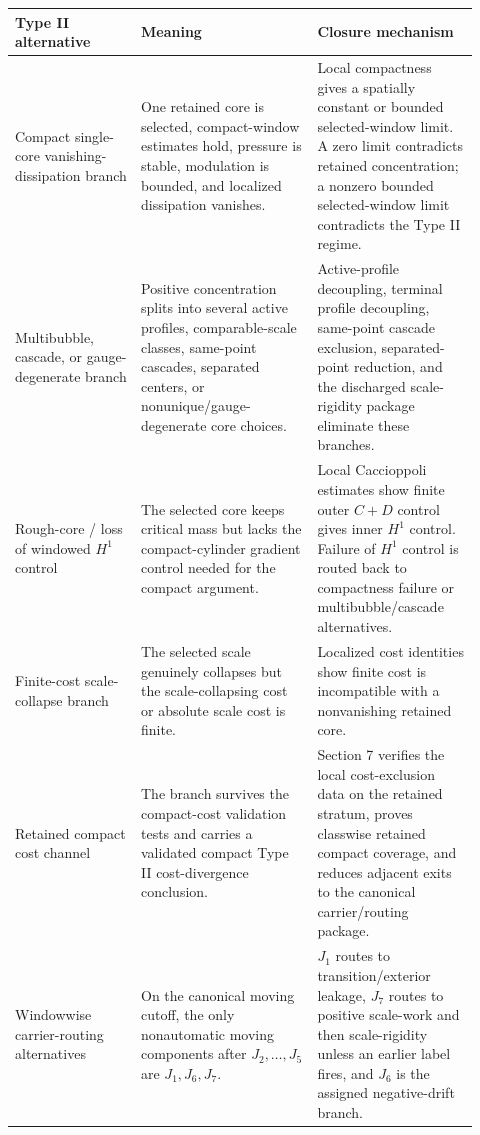 \documentclass[11pt]{amsart}
\begin{document}
\begin{longtable}{@{}>{\raggedright\arraybackslash}p{0.25\linewidth}>{\raggedright\arraybackslash}p{0.35\linewidth}>{\raggedright\arraybackslash}p{0.32\linewidth}@{}}
\toprule
\textbf{Type II alternative} & \textbf{Meaning} & \textbf{Closure mechanism} \\
\midrule
\endhead
Compact single-core vanishing-dissipation branch & One retained core is selected, compact-window estimates hold, pressure is stable, modulation is bounded, and localized dissipation vanishes. & Local compactness gives a spatially constant or bounded selected-window limit. A zero limit contradicts retained concentration; a nonzero bounded selected-window limit contradicts the Type II regime. \\
Multibubble, cascade, or gauge-degenerate branch & Positive concentration splits into several active profiles, comparable-scale classes, same-point cascades, separated centers, or nonunique/gauge-degenerate core choices. & Active-profile decoupling, terminal profile decoupling, same-point cascade exclusion, separated-point reduction, and the discharged scale-rigidity package eliminate these branches. \\
Rough-core / loss of windowed \(H^1\) control & The selected core keeps critical mass but lacks the compact-cylinder gradient control needed for the compact argument. & Local Caccioppoli estimates show finite outer \(C+D\) control gives inner \(H^1\) control. Failure of \(H^1\) control is routed back to compactness failure or multibubble/cascade alternatives. \\
Finite-cost scale-collapse branch & The selected scale genuinely collapses but the scale-collapsing cost or absolute scale cost is finite. & Localized cost identities show finite cost is incompatible with a nonvanishing retained core. \\
Retained compact cost channel & The branch survives the compact-cost validation tests and carries a validated compact Type II cost-divergence conclusion. & Section 7 verifies the local cost-exclusion data on the retained stratum, proves classwise retained compact coverage, and reduces adjacent exits to the canonical carrier/routing package. \\
Windowwise carrier-routing alternatives & On the canonical moving cutoff, the only nonautomatic moving components after \(J_2,\dots,J_5\) are \(J_1,J_6,J_7\). & \(J_1\) routes to transition/exterior leakage, \(J_7\) routes to positive scale-work and then scale-rigidity unless an earlier label fires, and \(J_6\) is the assigned negative-drift branch. \\

\end{longtable}
\end{document}
